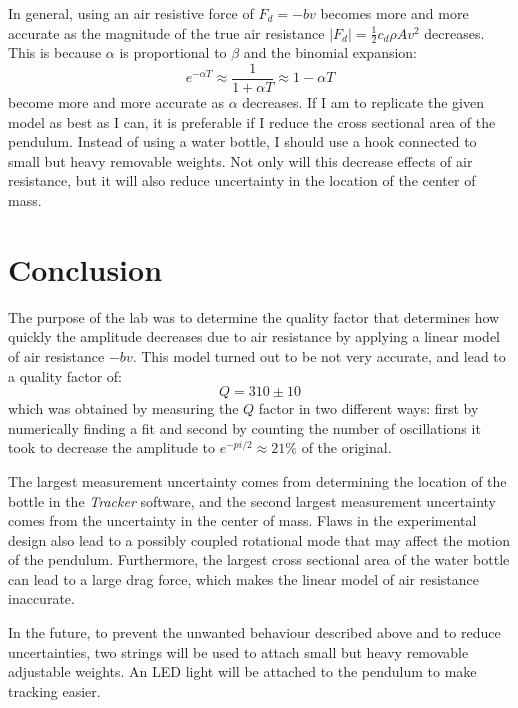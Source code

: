 \documentclass[%
 reprint,
 amsmath,amssymb
 aps,
]{revtex4-2}
\begin{document}
In general, using an air resistive force of $F_d=-bv$ becomes more and more accurate as the magnitude of the true air resistance $|F_d| = \frac{1}{2}c_d\rho Av^2$ decreases. This is because $\alpha$ is proportional to $\beta$ and the binomial expansion:
\begin{equation}
    e^{-\alpha T}\approx \frac{1}{1+\alpha T} \approx 1-\alpha T
    \label{eq:}
\end{equation}
become more and more accurate as $\alpha$ decreases. If I am to replicate the given model as best as I can, it is preferable if I reduce the cross sectional area of the pendulum. Instead of using a water bottle, I should use a hook connected to small but heavy removable weights. Not only will this decrease effects of air resistance, but it will also reduce uncertainty in the location of the center of mass.
\section{Conclusion}
The purpose of the lab was to determine the quality factor that determines how quickly the amplitude decreases due to air resistance by applying a linear model of air resistance $-bv$. This model turned out to be not very accurate, and lead to a quality factor of:
$$Q = 310 \pm 10$$
which was obtained by measuring the $Q$ factor in two different ways: first by numerically finding a fit and second by counting the number of oscillations it took to decrease the amplitude to $e^{-pi/2} \approx 21\%$ of the original.

The largest measurement uncertainty comes from determining the location of the bottle in the \textit{Tracker} software, and the second largest measurement uncertainty comes from the uncertainty in the center of mass. Flaws in the experimental design also lead to a possibly coupled rotational mode that may affect the motion of the pendulum. Furthermore, the largest cross sectional area of the water bottle can lead to a large drag force, which makes the linear model of air resistance inaccurate.

In the future, to prevent the unwanted behaviour described above and to reduce uncertainties, two strings will be used to attach small but heavy removable adjustable weights. An LED light will be attached to the pendulum to make tracking easier.

\onecolumngrid


\newpage
\appendix
\end{document}
